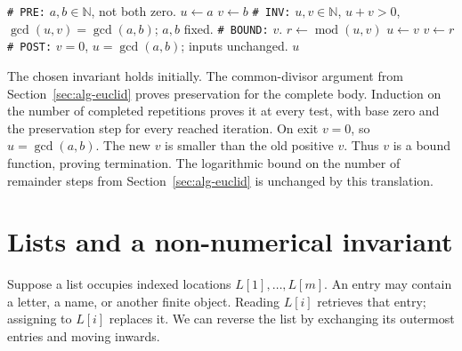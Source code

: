 \begin{algorithm}[H]
\begin{algorithmic}[1]
\Statex \texttt{\# PRE:} $a,b\in\mathbb N$, not both zero.
\State $u\leftarrow a$
\State $v\leftarrow b$
\Statex \texttt{\# INV:} $u,v\in\mathbb N$, $u+v>0$, $\gcd(u,v)=\gcd(a,b)$; $a,b$ fixed.
\Statex \texttt{\# BOUND:} $v$.
\State $r\leftarrow\operatorname{mod}(u,v)$
\State $u\leftarrow v$
\State $v\leftarrow r$
\EndWhile
\Statex \texttt{\# POST:} $v=0$, $u=\gcd(a,b)$; inputs unchanged.
\State \Return $u$
\EndProcedure
\end{algorithmic}
\caption{Preserve the gcd, using temporary storage for the remainder.}
\end{algorithm}

The chosen invariant holds initially. The common-divisor argument from
Section~\ref{sec:alg-euclid} proves preservation for the complete body. Induction
on the number of completed repetitions proves it at every test, with base
zero and the preservation step for every reached iteration.
On exit $v=0$, so $u=\gcd(a,b)$. The new $v$ is smaller than the old
positive $v$. Thus $v$ is a bound function, proving termination. The logarithmic bound on the
number of remainder steps from Section~\ref{sec:alg-euclid} is unchanged
by this translation.

\section{Lists and a non-numerical invariant}

Suppose a list occupies indexed locations $L[1],\ldots,L[m]$. An entry
may contain a letter, a name, or another finite object. Reading $L[i]$
retrieves that entry; assigning to $L[i]$ replaces it. We can reverse the
list by exchanging its outermost entries and moving inwards.

